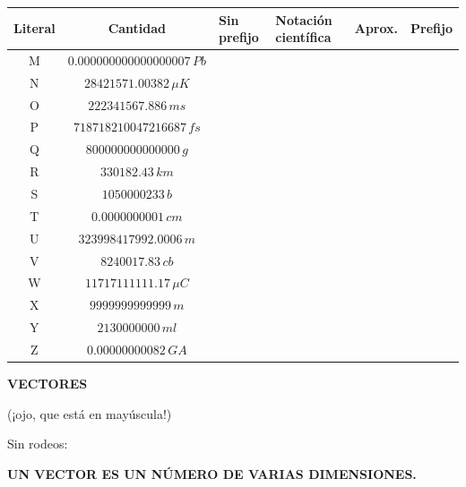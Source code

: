 \begin{frame}
\footnotesize
    \begin{table}[H]
    \centering
    \begin{tabular}{|c|c|M{1cm}|M{1cm}|M{1cm}|M{1cm}|}
    \hline
        Literal & Cantidad & Sin prefijo & Notación científica & Aprox. & Prefijo  \\\hline\hline
        M & $\num{0.000000000000000007} \,\unit{Pb}$ & & &  & \\\hline
        N & $\num{28421571.00382} \,\unit{\mu K}$ & & &  & \\\hline
        O & $\num{222341567.886} \,\unit{ms}$ & & &  & \\\hline
        P & $\num{718718210047216687} \,\unit{fs}$ & &  &  & \\\hline
        Q & $\num{800000000000000} \,\unit{g}$ & & &  & \\\hline
        R & $\num{330182.43} \,\unit{km}$ & & &  & \\\hline
        S & $\num{1050000233} \,\unit{b}$ & & &  & \\\hline
        T & $\num{0.0000000001} \,\unit{cm}$ & & &  & \\\hline
        U & $\num{323998417992.0006} \,\unit{m}$ & & &  & \\\hline
        V & $\num{8240017.83} \,\unit{cb}$ & & &  & \\\hline
        W & $\num{11717111111.17} \,\unit{\mu C}$ & & &  & \\\hline
        X & $\num{9999999999999} \,\unit{m}$ & & &  & \\\hline
        Y & $\num{2130000000} \,\unit{ml}$ & & &  & \\\hline
        Z & $\num{0.00000000082} \,\unit{GA}$ & & &  & \\\hline
    \end{tabular}
\end{table}
\end{frame}

\begin{frame}
\begin{center}
    {\Huge \textbf{VECTORES}}

    \vspace{1em}
    
    (¡ojo, que está en mayúscula!)
\end{center}
    
\end{frame}

\begin{frame}
    
    \begin{center}
    Sin rodeos:
    
    \vspace{2em}
    
        \LARGE \textbf{UN VECTOR ES UN NÚMERO DE VARIAS DIMENSIONES.}
    \end{center}
    
\end{frame}

